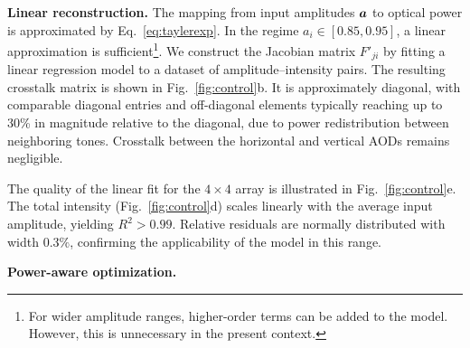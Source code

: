 \textbf{Linear reconstruction.}
The mapping from input amplitudes $\boldsymbol{a}$ to optical power is approximated by Eq.~\eqref{eq:taylerexp}. In the regime $a_i \in [0.85, 0.95]$, a linear approximation is sufficient\footnote{
    For wider amplitude ranges, higher-order terms can be added to the model. However, this is unnecessary in the present context.
}. We construct the Jacobian matrix $F'_{ji}$ by fitting a linear regression model to a dataset of amplitude–intensity pairs. The resulting crosstalk matrix is shown in Fig.~\ref{fig:control}b. It is approximately diagonal, with comparable diagonal entries and off-diagonal elements typically reaching up to 30\% in magnitude relative to the diagonal, due to power redistribution between neighboring tones. Crosstalk between the horizontal and vertical AODs remains negligible.

The quality of the linear fit for the $4 \times 4$ array is illustrated in Fig.~\ref{fig:control}e. The total intensity (Fig.~\ref{fig:control}d) scales linearly with the average input amplitude, yielding $R^2 > 0.99$. Relative residuals are normally distributed with width $0.3\%$, confirming the applicability of the model in this range.

\textbf{Power-aware optimization.}



